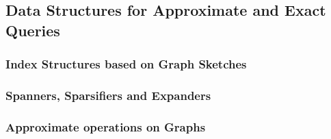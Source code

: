 \subsection{Data Structures for Approximate and Exact Queries}
\label{sec:approx-exacts}

\subsubsection{Index Structures based on Graph Sketches}
\label{sec:indexing-dynamic-graphs}

\subsubsection{Spanners, Sparsifiers and Expanders}
\label{sec:spanners}

\subsubsection{Approximate operations on Graphs}
\label{sec:approximate-problems}



